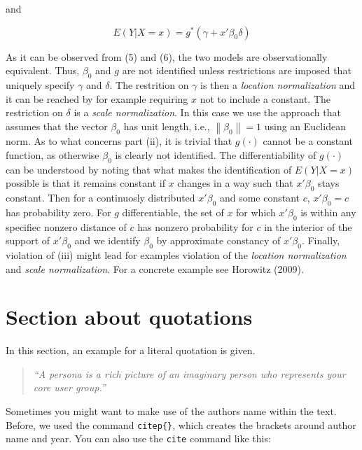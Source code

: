 \documentclass[a4paper]{article}
\newcommand{\norm}[1]{\left\lVert#1\right\rVert}
\begin{document}
and

\begin{equation}
E(Y|X = x) = g^*(\gamma + x'\beta_0\delta)
\end{equation}

As it can be observed from (5) and (6), the two models are observationally equivalent. Thus, $\beta_0$ and $g$ are not identified unless restrictions are imposed that uniquely specify $\gamma$ and $\delta$. The restrition on $\gamma$ is then a \textit{location normalization} and it can be reached by for example requiring $x$ not to include a constant. The restriction on $\delta$ is a \textit{scale normalization}. In this case we use the approach that assumes that the vector $\beta_0$ has unit length, i.e., $\norm{ \beta_0 } = 1$ using an Euclidean norm.
As to what concerns part (ii), it is trivial that $g(\cdot)$ cannot be a constant function, as otherwise $\beta_0$ is clearly not identified. The differentiability of $g(\cdot)$ can be understood by noting that what makes the identification of $E(Y|X = x)$ possible is that it remains constant if $x$ changes in a way such that $x'\beta_0$ stays constant. Then for a continuosly distributed $x'\beta_0$ and some constant $c$, $x'\beta_0 = c$ has probability zero. For $g$ differentiable, the set of $x$ for which $x'\beta_0$ is within any specifiec nonzero distance of $c$ has nonzero probability for $c$ in the interior of the support of $x'\beta_0$ and we identify $\beta_0$ by approximate constancy of $x'\beta_0$.
Finally, violation of (iii) might lead for examples violation of the \textit{location normalization} and \textit{scale normalization}. For a concrete example see Horowitz (2009).
\section{Section about quotations} %
\label{sec:section_about_quotations}

In this section, an example for a literal quotation is given. 

\begin{quotation}
	\emph{``A persona is a rich picture of an imaginary person who represents your core user group.''}
	\citep{Dix04}
\end{quotation}

Sometimes you might want to make use of the authors name within the text. Before, we used the command \texttt{citep\{\}}, which creates the brackets around author name and year. You can also use the \texttt{cite} command like this: \\
\end{document}
